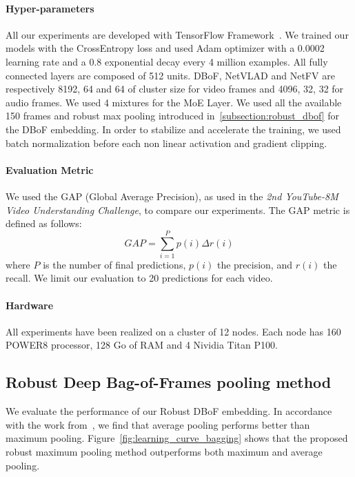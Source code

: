 \documentclass[runningheads]{llncs}
\begin{document}
\paragraph*{\textbf{Hyper-parameters}}
All our experiments are developed with TensorFlow Framework~\cite{tensorflow2015-whitepaper}. We trained our models with the CrossEntropy loss and used Adam optimizer with a 0.0002 learning rate and a 0.8 exponential decay every 4 million examples. All fully connected layers are composed of 512 units. DBoF, NetVLAD and NetFV are respectively 8192, 64 and 64 of cluster size for video frames and 4096, 32, 32 for audio frames. We used 4 mixtures for the MoE Layer. We used all the available 150 frames and robust max pooling introduced in~\ref{subsection:robust_dbof} for the DBoF embedding. In order to stabilize and accelerate the training, we used batch normalization before each non linear activation and gradient clipping.

\paragraph*{\textbf{Evaluation Metric}}
We used the GAP (Global Average Precision), as used in the \textit{2nd YouTube-8M Video Understanding Challenge}, to compare our experiments. The GAP metric is defined as follows:
\begin{equation*}
	GAP = \sum_{i=1}^{P}p(i) \Delta r(i)
\end{equation*}
where $P$ is the number of final predictions, $p(i)$ the precision, and $r(i)$ the recall. We limit our evaluation to 20 predictions for each video.

\paragraph*{\textbf{Hardware}}
All experiments have been realized on a cluster of 12 nodes. Each node has 160 POWER8 processor, 128 Go of RAM and 4 Nividia Titan P100.

\subsection{Robust Deep Bag-of-Frames pooling method}
\label{subsection:exp_bagging}
We evaluate the performance of our Robust DBoF embedding. In accordance with the work from~\cite{45619}, we find that average pooling performs better than maximum pooling.
Figure~\ref{fig:learning_curve_bagging} shows that the proposed robust maximum pooling method outperforms both maximum and average pooling.
\end{document}
